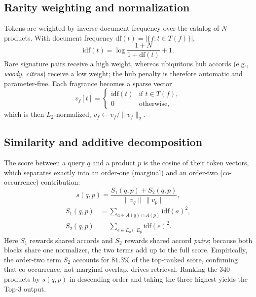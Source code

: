 \documentclass[conference]{IEEEtran}
\begin{document}
\subsection{Rarity weighting and normalization}
Tokens are weighted by inverse document frequency over the catalog of $N$ products.
With document frequency $\mathrm{df}(t)=\lvert\{f:t\in T(f)\}\rvert$,
\begin{equation}
\mathrm{idf}(t)=\log\!\frac{1+N}{1+\mathrm{df}(t)}+1. \label{eq:idf}
\end{equation}
Rare signature pairs receive a high weight, whereas ubiquitous hub accords (e.g.,
\textit{woody}, \textit{citrus}) receive a low weight; the hub penalty is therefore
automatic and parameter-free. Each fragrance becomes a sparse vector
\begin{equation}
v_f[t]=
\begin{cases}
\mathrm{idf}(t) & \text{if } t\in T(f),\\
0 & \text{otherwise,}
\end{cases}
\label{eq:vector}
\end{equation}
which is then $L_2$-normalized, $v_f\leftarrow v_f/\lVert v_f\rVert_2$.

\subsection{Similarity and additive decomposition}
The score between a query $q$ and a product $p$ is the cosine of their token vectors,
which separates exactly into an order-one (marginal) and an order-two (co-occurrence)
contribution:
\begin{equation}
s(q,p)=\frac{S_1(q,p)+S_2(q,p)}{\lVert v_q\rVert\,\lVert v_p\rVert}, \label{eq:score}
\end{equation}
\begin{align}
S_1(q,p)&=\sum_{a\in A(q)\cap A(p)}\mathrm{idf}(a)^2,\label{eq:s1}\\
S_2(q,p)&=\sum_{e\in E_q\cap E_p}\mathrm{idf}(e)^2.\label{eq:terms}
\end{align}
Here $S_1$ rewards shared accords and $S_2$ rewards shared accord \emph{pairs}; because
both blocks share one normalizer, the two terms add up to the full score. Empirically,
the order-two term $S_2$ accounts for $81.3\%$ of the top-ranked score, confirming that
co-occurrence, not marginal overlap, drives retrieval. Ranking the $340$ products by
$s(q,p)$ in descending order and taking the three highest yields the Top-3 output.
\end{document}
